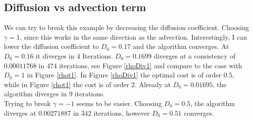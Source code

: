 \documentclass[11pt, a4paper]{article}
\theoremstyle{definition}
\begin{document}
\subsection{Diffusion vs advection term}
We can try to break this example by decreasing the diffusion coefficient.
Choosing $\gamma = 1$, since this works in the same direction as the advection. Interestingly, I can lower the diffusion coefficient to $D_0 = 0.17$ and the algorithm converges. At $D_0 = 0.16$ it diverges in $4$ Iterations.
$D_0 = 0.1699$ diverges at a consistency of $0.00011768$ in $474$ iterations, see Figure \ref{rhoDiv1} and compare to the case with $D_0=1$ in Figure \ref{rhot1}. In Figure \ref{rhoDiv1} the optimal cost is of order $0.5$, while in Figure \ref{rhot1} the cost is of order $2$.
Already at $D_0 = 0.01695$, the algorithm diverges in $9$ iterations. \\
Trying to break $\gamma = -1$ seems to be easier. Choosing $D_0 =0.5$, the algorithm diverges at $0.00271887$ in $342$ iterations, however $D_0 =0.51$ converges.
\end{document}
